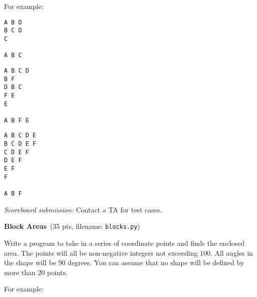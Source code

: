\documentclass[11pt]{cselabheader}
\newcommand{\cop}[3]{\textbf{#1}~(#2 pts, filename: \texttt{#3})\quad}
\theoremstyle{plain}
\begin{document}
\begin{enumerate}
    For example:\\
    \begin{minipage}{.33\linewidth}
      \begin{minipage}{.8\linewidth}
        \begin{lstlisting}[style=bash]
A B D
B C D
C

A B C
        \end{lstlisting}
      \end{minipage}
    \end{minipage}
    \begin{minipage}{.33\linewidth}
      \begin{minipage}{.8\linewidth}
        \begin{lstlisting}[style=bash]
A B C D
B F
D B C
F E
E

A B F E
        \end{lstlisting}
      \end{minipage}
    \end{minipage}
    \begin{minipage}{.33\linewidth}
      \begin{minipage}{.8\linewidth}
        \begin{lstlisting}[style=bash]
A B C D E
B C D E F
C D E F
D E F
E F
F

A B F
        \end{lstlisting}
      \end{minipage}
    \end{minipage}

    \textit{Scoreboard submission:} Contact a TA for test cases.

  \item \cop{Block Areas}{35}{blocks.py}

    Write a program to take in a series of coordinate points and finds the 
    enclosed area. The points will all be non-negative integers not 
    exceeding 100. All angles in the shape will be 90 degrees. You can 
    assume that no shape will be defined by more than 20 points. 

    For example:
    \begin{figure}[!ht]
      \centering
\end{figure}
\end{enumerate}
\end{document}
